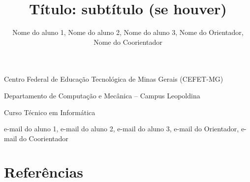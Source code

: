 \documentclass[a4paper,12pt,singlespacing]{article}
\title{Título: subtítulo (se houver)}
\author{Nome do aluno 1, Nome do aluno 2, Nome do aluno 3, Nome do Orientador, Nome do Coorientador}
\def\emails{e-mail do aluno 1, e-mail do aluno 2, e-mail do aluno 3, e-mail do Orientador, e-mail do Coorientador}
\begin{document}
    {\centering
        \setlength{\parskip}{0pt}
        Centro Federal de Educação Tecnológica de Minas Gerais (CEFET-MG)
        
        \setlength{\parskip}{0pt}
        Departamento de Computação e Mecânica – Campus Leopoldina
        
        \setlength{\parskip}{0pt}
        Curso Técnico em Informática
        
        \setlength{\parskip}{18pt}
        \textbf{ \thetitle }
        \setlength{\parskip}{12pt}
        
        \theauthor
        
        \setlength{\parskip}{6pt}
        \footnotesize{\emails}
        
    }

    \justifying
    
    
    
    
    
    
    
    
    
    
    
    
    
    
    
    
    
    
    \section{Referências}

    \raggedright
    \printbibliography[heading=none]
\end{document}
